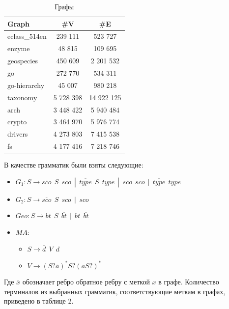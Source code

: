 \begin{table}[H]
\begin{center}
{

\begin{tabular}{|l|c|c|}
\hline
Graph          & \#V       & \#E        \\
\hline
\hline
eclass\_514en  & 239 111    & 523 727   \\
enzyme         & 48 815     & 109 695   \\
geospecies     & 450 609    & 2 201 532 \\
go             & 272 770    & 534 311   \\
go-hierarchy   & 45 007     & 980 218   \\
taxonomy       & 5 728 398  & 14 922 125\\
\hline
arch           & 3 448 422  & 5 940 484 \\
crypto         & 3 464 970  & 5 976 774 \\
drivers        & 4 273 803  & 7 415 538 \\
fs             & 4 177 416  & 7 218 746 \\
\hline
\end{tabular}
}
\end{center}
\caption{Графы}
\end{table}
В качестве грамматик были взяты следующие:
\begin{itemize}
    \item $G_1: S \to \overline{sco} \ \ S \ \ sco\ \ | \ \ \overline{type} \ \ S \ \ type \ \ | \ \ \overline{sco} \ \ sco \ \ | \ \ \overline{type} \ \ type$
    \item $G_2: S \to \overline{sco} \ \ S \ \ sco \ \ | \ \ sco$
    \item $Geo: S \to bt \ \ S \ \ \overline{bt} \ \ | \ \ bt \ \ \overline{bt}$
    \item $MA:$
    \begin{itemize}
        \item $S \to \overline{d} \ \ V \ \ d$
        \item $V \to (S?\overline{a})^{*}S?(aS?)^{*}$
    \end{itemize}
\end{itemize}
Где $\overline{x}$ обозначает ребро обратное ребру с меткой $x$ в графе. Количество терминалов из выбранных грамматик, соответствующие меткам в графах, приведено в таблице 2.
